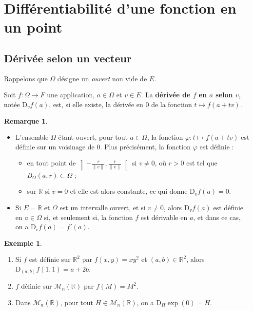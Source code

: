 \documentclass[french]{article}
\newcommand{\R}{\mathbb{R}}
\newcommand{\D}{\text{D}}
\theoremstyle{plain}
\theoremstyle{definition}
\newtheorem*{ex}{Exemple}
\newtheorem*{rmq}{Remarque}
\theoremstyle{remark}
\begin{document}
\section{Différentiabilité d'une fonction en un point}

\subsection{Dérivée selon un vecteur}

Rappelons que $\Omega$ désigne un \textit{ouvert} non vide de $E$.

\begin{dfn}
	Soit $f:\Omega\to F$ une application, $a\in\Omega$ et $v\in E$. La \textbf{dérivée de $f$ en $a$ selon $v$}, notée $\D_vf(a)$, est, si elle existe, la dérivée en $0$ de la fonction $t\mapsto f(a+tv)$.
\end{dfn}

\begin{rmq}
	\begin{itemize}
		\item L'ensemble $\Omega$ étant ouvert, pour tout $a\in\Omega$, la fonction $\varphi:t\mapsto f(a+tv)$ est définie sur un voisinage de $0$. Plus précisément, la fonction $\varphi$ est définie :
		\begin{itemize}[label=$\star$]
			\item en tout point de $\left]-\frac{r}{\lVert v\rVert},\frac{r}{\lVert v\rVert}\right[$ si $v\ne 0$, où $r>0$ est tel que $B_O(a,r)\subset\Omega$ ;
			\item sur $\R$ si $v=0$ et elle est alors constante, ce qui donne $\D_vf(a)=0$.
		\end{itemize}
		\item Si $E=\R$ et $\Omega$ est un intervalle ouvert, et si $v\ne0$, alors $\D_vf(a)$ est définie en $a\in\Omega$ si, et seulement si, la fonction $f$ est dérivable en $a$, et dans ce cas, on a $\D_vf(a)=f'(a)$.
	\end{itemize}
\end{rmq}

\begin{ex}
	\begin{enumerate}
		\item Si $f$ est définie sur $\R^2$ par $f(x,y)=xy^2$ et $(a,b)\in\R^2$, alors $\D_{(a,b)}f(1,1)=a+2b$.
		\item $f$ définie sur $\mathcal{M}_n(\R)$ par $f(M)=M^2$.
		\item Dans $\mathcal{M}_n(\R)$, pour tout $H\in\mathcal{M}_n(\R)$, on a $\D_H\exp(0)=H$.
	\end{enumerate}
\end{ex}
\end{document}
